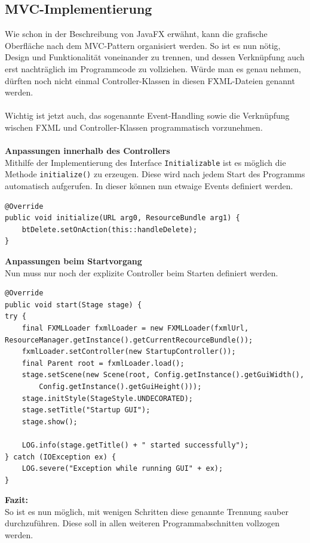 \subsection{MVC-Implementierung}\label{subsec:mvc}
Wie schon in der Beschreibung von JavaFX erwähnt, kann die grafische Oberfläche nach dem MVC-Pattern organisiert werden.
So ist es nun nötig, Design und Funktionalität voneinander zu trennen, und dessen Verknüpfung auch erst nachträglich im Programmcode zu vollziehen.
Würde man es genau nehmen, dürften noch nicht einmal Controller-Klassen in diesen FXML-Dateien genannt werden.\\\\
Wichtig ist jetzt auch, das sogenannte Event-Handling sowie die Verknüpfung wischen FXML und Controller-Klassen programmatisch vorzunehmen.\\\\
\textbf{Anpassungen innerhalb des Controllers}\\
Mithilfe der Implementierung des Interface \lstinline[style=java]{Initializable} ist es möglich die Methode \lstinline[style=java]{initialize()} zu erzeugen.
Diese wird nach jedem Start des Programms automatisch aufgerufen.
In dieser können nun etwaige Events definiert werden.
\begin{lstlisting}[style=java,caption=Methode initialize(),label=loggerOutput]
@Override
public void initialize(URL arg0, ResourceBundle arg1) {
    btDelete.setOnAction(this::handleDelete);
}
\end{lstlisting}
\textbf{Anpassungen beim Startvorgang}\\
Nun muss nur noch der explizite Controller beim Starten definiert werden.
\begin{lstlisting}[style=java,caption=Methode start(),label=loggerOutput]
@Override
public void start(Stage stage) {
try {
    final FXMLLoader fxmlLoader = new FXMLLoader(fxmlUrl, ResourceManager.getInstance().getCurrentRecourceBundle());
    fxmlLoader.setController(new StartupController());
    final Parent root = fxmlLoader.load();
    stage.setScene(new Scene(root, Config.getInstance().getGuiWidth(),
        Config.getInstance().getGuiHeight()));
    stage.initStyle(StageStyle.UNDECORATED);
    stage.setTitle("Startup GUI");
    stage.show();

    LOG.info(stage.getTitle() + " started successfully");
} catch (IOException ex) {
    LOG.severe("Exception while running GUI" + ex);
}
\end{lstlisting}
\textbf{Fazit:}\\
So ist es nun möglich, mit wenigen Schritten diese genannte Trennung sauber durchzuführen.
Diese soll in allen weiteren Programmabschnitten vollzogen werden.
